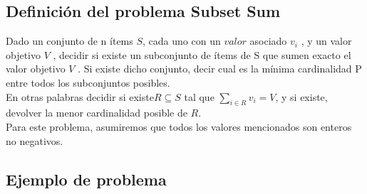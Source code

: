 
\subsection{Definici\'on del problema Subset Sum}
Dado un conjunto de n \'items $S$, cada uno con un $valor$ asociado $v_{i}$ , y un valor objetivo $V$ ,
decidir si existe un subconjunto de \'items de S que sumen exacto el valor objetivo $V$ . Si existe
dicho conjunto, decir cual es la m\'inima cardinalidad
P entre todos los subconjuntos posibles. \\
En otras palabras decidir si existe$ R \subseteq S$ tal que $\sum_{i \in R}v_{i} = V$, y si existe, devolver la menor cardinalidad posible de $R$.\\
Para este problema, asumiremos que todos los valores mencionados son enteros no negativos.
\subsection{Ejemplo de problema}

